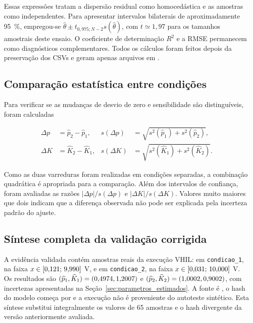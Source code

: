 \documentclass[12pt,a4paper]{article}
\newcommand{\arquivo}[1]{\texttt{\detokenize{#1}}}
\newcommand{\condum}{\texttt{condicao\_1}}
\newcommand{\conddois}{\texttt{condicao\_2}}
\begin{document}
Essas expressões tratam a dispersão residual como homocedástica e as amostras como independentes. Para apresentar intervalos bilaterais de aproximadamente \SI{95}{\percent}, empregou-se $\widehat\theta\pm t_{0{,}975;N-2}s(\widehat\theta)$, com $t\simeq1{,}97$ para os tamanhos amostrais deste ensaio. O coeficiente de determinação $R^2$ e a RMSE permanecem como diagnósticos complementares. Todos os cálculos foram feitos depois da preservação dos CSVs e geram apenas arquivos em \arquivo{dados_derivados/}.

\subsection{Comparação estatística entre condições}

Para verificar se as mudanças de desvio de zero e sensibilidade são distinguíveis, foram calculadas

\begin{align}
  \Delta p &= \widehat p_2-\widehat p_1,
  &s(\Delta p)&=\sqrt{s^2(\widehat p_1)+s^2(\widehat p_2)},\\
  \Delta K &= \widehat K_2-\widehat K_1,
  &s(\Delta K)&=\sqrt{s^2(\widehat K_1)+s^2(\widehat K_2)}.
\end{align}

Como as duas varreduras foram realizadas em condições separadas, a combinação quadrática é apropriada para a comparação. Além dos intervalos de confiança, foram avaliadas as razões $|\Delta p|/s(\Delta p)$ e $|\Delta K|/s(\Delta K)$. Valores muito maiores que dois indicam que a diferença observada não pode ser explicada pela incerteza padrão do ajuste.

\subsection{Síntese completa da validação corrigida}

A evidência validada contém \TotalAmostras{} amostras reais da execução VHIL: \AmostrasUm{} em \condum, na faixa $x\in[0{,}121;\,9{,}990]$ V, e \AmostrasDois{} em \conddois, na faixa $x\in[0{,}031;\,10{,}000]$ V. Os resultados são $(\widehat p_1,\widehat K_1)=(0{,}4974,1{,}2007)$ e $(\widehat p_2,\widehat K_2)=(1{,}0002,0{,}9002)$, com incertezas apresentadas na Seção~\ref{sec:parametros_estimados}. A fonte é \OrigemAquisicao, o hash do modelo começa por \HashModeloCurto{} e a execução não é proveniente do autoteste sintético. Esta síntese substitui integralmente os valores de 65 amostras e o hash divergente da versão anteriormente avaliada.
\end{document}
